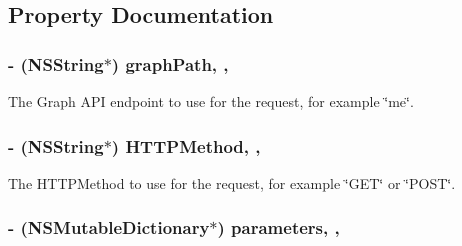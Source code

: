 \subsection{Property Documentation}
\hypertarget{interface_f_b_s_d_k_graph_request_a10e91143d0aa1301a527f43c60c53535}{
\subsubsection[{graph\-Path}]{\setlength{\rightskip}{0pt plus 5cm}-\/ (N\-S\-String$\ast$) graph\-Path\hspace{0.3cm}{\ttfamily [read]}, {\ttfamily [nonatomic]}, {\ttfamily [copy]}}}\label{interface_f_b_s_d_k_graph_request_a10e91143d0aa1301a527f43c60c53535}
The Graph A\-P\-I endpoint to use for the request, for example \char`\"{}me\char`\"{}. \hypertarget{interface_f_b_s_d_k_graph_request_a8a290580d36baf0de7aacf859a13902c}{
\subsubsection[{H\-T\-T\-P\-Method}]{\setlength{\rightskip}{0pt plus 5cm}-\/ (N\-S\-String$\ast$) H\-T\-T\-P\-Method\hspace{0.3cm}{\ttfamily [read]}, {\ttfamily [nonatomic]}, {\ttfamily [copy]}}}\label{interface_f_b_s_d_k_graph_request_a8a290580d36baf0de7aacf859a13902c}
The H\-T\-T\-P\-Method to use for the request, for example \char`\"{}\-G\-E\-T\char`\"{} or \char`\"{}\-P\-O\-S\-T\char`\"{}. \hypertarget{interface_f_b_s_d_k_graph_request_af769aa811f0eb9f2f1e56b4ac6e323e1}{
\subsubsection[{parameters}]{\setlength{\rightskip}{0pt plus 5cm}-\/ (N\-S\-Mutable\-Dictionary$\ast$) parameters\hspace{0.3cm}{\ttfamily [read]}, {\ttfamily [nonatomic]}, {\ttfamily [strong]}}}\label{interface_f_b_s_d_k_graph_request_af769aa811f0eb9f2f1e56b4ac6e323e1}
